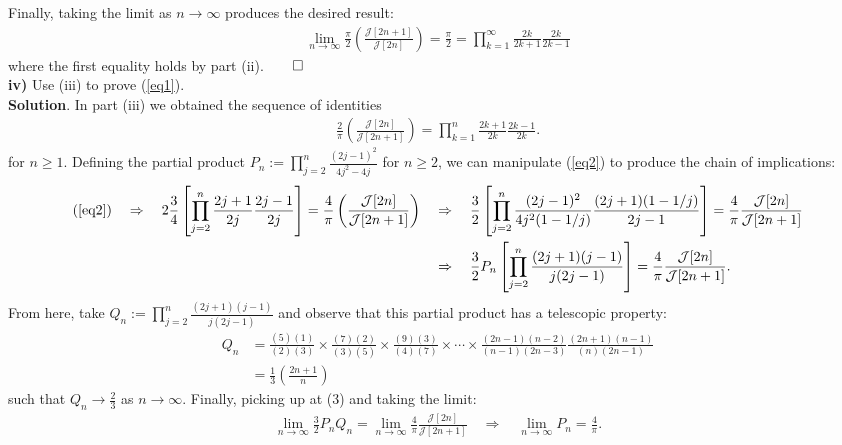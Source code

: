 \documentclass[10pt]{article}
\newcommand{\1}[1]{\mathbbm{1}_{#1}}
\newcommand{\mc}[1]{\mathcal{#1}}
\begin{document}
    Finally, taking the limit as $n\rightarrow\infty$ produces the desired result:
    \begin{align*}
        \lim_{n\rightarrow\infty}\frac{\pi}{2}\left(\frac{\mc{J}[2n+1]}{\mc{J}[2n]}\right)=\frac{\pi}{2}=\prod_{k=1}^\infty\frac{2k}{2k+1}\frac{2k}{2k-1}
    \end{align*}
    where the first equality holds by part (ii).\hfill{$\qed$}\\[5pt]
    {\bf iv)} Use (iii) to prove (\ref{eq1}).\\[5pt]
    {\bf Solution}. In part (iii) we obtained the sequence of identities
    \begin{align}
        \frac{2}{\pi}\left(\frac{\mc{J}[2n]}{\mc{J}[2n+1]}\right)=\prod_{k=1}^n\frac{2k+1}{2k}\frac{2k-1}{2k}.\label{eq2}
    \end{align} 
    for $n\geq 1$. Defining the partial product $P_n:=\prod_{j=2}^n\tfrac{(2j-1)^2}{4j^2-4j}$ for $n\geq 2$, we can manipulate (\ref{eq2}) to produce the chain of
    implications:
    \begin{align}
        (\ref{eq2})\quad\Rightarrow\quad 2\frac{3}{4}\left[\prod_{j=2}^n\frac{2j+1}{2j}\frac{2j-1}{2j}\right]=\frac{4}{\pi}\left(\frac{\mc{J}[2n]}{\mc{J}[2n+1]}\right)\quad&\Rightarrow\quad\frac{3}{2}\left[\prod_{j=2}^n\frac{(2j-1)^2}{4j^2(1-1/j)}\frac{(2j+1)(1-1/j)}{2j-1}\right]=\frac{4}{\pi}\frac{\mc{J}[2n]}{\mc{J}[2n+1]}\\
        &\Rightarrow\quad\frac{3}{2}P_n\left[\prod_{j=2}^n\frac{(2j+1)(j-1)}{j(2j-1)}\right]=\frac{4}{\pi}\frac{\mc{J}[2n]}{\mc{J}[2n+1]}.\label{eq3}
    \end{align}
    From here, take $Q_n:=\prod_{j=2}^n\tfrac{(2j+1)(j-1)}{j(2j-1)}$ and observe that this partial product has a telescopic property:
    \begin{align*}
        Q_n&=\frac{(5)(1)}{(2)(3)}\times\frac{(7)(2)}{(3)(5)}\times\frac{(9)(3)}{(4)(7)}\times\cdots\times\frac{(2n-1)(n-2)}{(n-1)(2n-3)}\frac{(2n+1)(n-1)}{(n)(2n-1)}\\
        &=\frac{1}{3}\left(\frac{2n+1}{n}\right)
    \end{align*}
    such that $Q_n\rightarrow\tfrac{2}{3}$ as $n\rightarrow\infty$. Finally, picking up at (3) and taking the limit:
    \begin{align*}
        \lim_{n\rightarrow\infty}\frac{3}{2}P_nQ_n=\lim_{n\rightarrow\infty}\frac{4}{\pi}\frac{\mc{J}[2n]}{\mc{J}[2n+1]}\quad\Rightarrow\quad \lim_{n\rightarrow\infty}P_n=\frac{4}{\pi}.
    \end{align*}
\end{document}
